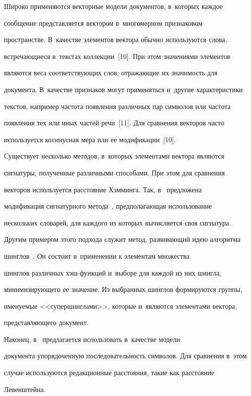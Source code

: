   Широко применяются векторные модели документов, в~которых каждое

сообщение представляется вектором в~многомерном признаковом

пространстве. В~качестве элементов вектора обычно используются слова,

встречающиеся в~текстах коллекции~[10]. При этом значениями элементов

являются веса соответствующих слов, отражающие их значимость для

документа. В~качестве признаков могут применяться и~другие характеристики

текстов, например частота появления различных пар символов или частота

появления тех или иных частей речи~[11]. Для сравнения векторов часто

используется косинусная мера или ее модификации~[10].



  Существует несколько методов, в~которых элементами вектора являются

сигнатуры, полученные различными способами. При этом для сравнения

векторов используется расстояние Хэмминга. Так, в~\cite{13-sim} предложена

модификация сигнатурного метода~\cite{5-sim}, предполагающая использование

нескольких словарей, для каждого из которых вычисляется своя сигнатура.

Другим примером этого подхода служит метод, развивающий идею алгоритма

шинглов~\cite{8-sim, 14-sim}. Он состоит в~применении к элементам множества

шинглов различных хэш-функ\-ций и~выборе для каждой из них шингла,

минимизирующего ее значение. Из выбранных шинглов формируются группы,

именуемые <<супершинглами>>, которые и~являются элементами вектора,

представляющего документ.



  Наконец, в~\cite{12-sim} предлагается использовать в~качестве модели

документа упорядоченную последовательность символов. Для сравнения в~этом

случае используются редакционные расстояния, такие как расстояние

Левенштейна.




